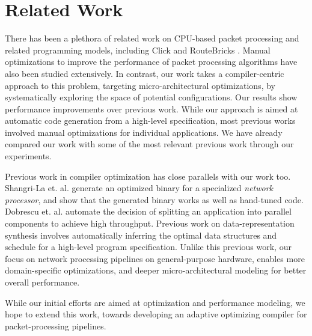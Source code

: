 \section{Related Work}
\label{relatedwork}
There has been a plethora of related work on CPU-based packet processing
and related programming models, including Click \cite{kohler2000click} and RouteBricks \cite{dobrescu2009routebricks}.
Manual optimizations to improve the performance of packet processing algorithms \cite{dobrescu2009routebricks, 189006, Kim:2012:PBC:2349896.2349910, Zhou:2013:SHP:2535372.2535379} have also been studied extensively.
In contrast, our work takes a compiler-centric approach to this problem, targeting micro-architectural
optimizations, by systematically exploring the space of potential configurations. Our results
show performance improvements over previous work. While our approach is aimed at automatic code generation from a high-level
specification, most previous works involved manual optimizations for individual applications. We have already compared our work
with some of the most relevant previous work through our experiments.


Previous work in compiler optimization has close parallels with our work too.
Shangri-La et. al. \cite{Chen:2005:SAH:1065010.1065038} generate an
optimized binary for a specialized {\em network processor}, and show that the generated binary works as
well as hand-tuned code. Dobrescu et. al. \cite{Dobrescu:2010:CPM:1921151.1921154} automate the decision
of splitting an application into parallel components to achieve high throughput. Previous work on
data-representation synthesis \cite{data_representation_synthesis, concurrent_data_representation_synthesis}
involves automatically inferring the optimal data structures and schedule for a high-level program
specification. Unlike this previous work, our focus on network processing pipelines on
general-purpose hardware, enables
more domain-specific optimizations, and deeper micro-architectural modeling for better
overall performance.

While our initial efforts are aimed at optimization and performance modeling, we hope
to extend this work, towards developing an adaptive optimizing compiler for packet-processing pipelines.

